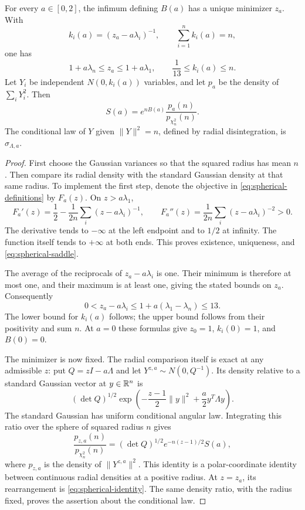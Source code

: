 \begin{lemma}
\label{lem:spherical-identity}
For every $a\in[0,2]$, the infimum defining $B(a)$ has a unique minimizer
$z_a$.  With
\begin{equation}
\label{eq:spherical-saddle}
 k_i(a)=(z_a-a\lambda_i)^{-1},
 \qquad
 \sum_{i=1}^n k_i(a)=n,
\end{equation}
one has
\[
 1+a\lambda_n\le z_a\le1+a\lambda_1,
 \qquad
 \frac1{13}\le k_i(a)\le n.
\]
Let $Y_i$ be independent $N(0,k_i(a))$ variables, and let $p_a$ be the
density of $\sum_iY_i^2$.  Then
\begin{equation}
\label{eq:spherical-identity}
 S(a)=e^{nB(a)}
       \frac{p_a(n)}{p_{\chi_n^2}(n)}.
\end{equation}
The conditional law of $Y$ given $\|Y\|^2=n$, defined by radial
disintegration, is $\sigma_{\Lambda,a}$.
\end{lemma}

\begin{proof}
First choose the Gaussian variances so that the squared radius has
mean $n$. Then compare its radial density with the standard Gaussian
density at that same radius. To implement the first step, denote the
objective in \eqref{eq:spherical-definitions} by $F_a(z)$. On
$z>a\lambda_1$,
\[
 F_a'(z)=\frac12-\frac1{2n}\sum_i(z-a\lambda_i)^{-1},
 \qquad
 F_a''(z)=\frac1{2n}\sum_i(z-a\lambda_i)^{-2}>0.
\]
The derivative tends to $-\infty$ at the left endpoint and to $1/2$
at infinity.  The function itself tends to $+\infty$ at both ends.
This proves existence, uniqueness, and \eqref{eq:spherical-saddle}.

The average of the reciprocals of $z_a-a\lambda_i$ is one.  Their
minimum is therefore at most one, and their maximum is at least one,
giving the stated bounds on $z_a$.  Consequently
\[
 0<z_a-a\lambda_i
 \le1+a(\lambda_1-\lambda_n)\le13.
\]
The lower bound for $k_i(a)$ follows; the upper bound follows from
their positivity and sum $n$.  At $a=0$ these formulas give
$z_0=1$, $k_i(0)=1$, and $B(0)=0$.

The minimizer is now fixed. The radial comparison itself is exact
at any admissible $z$: put $Q=zI-a\Lambda$ and let
$Y^{z,a}\sim N(0,Q^{-1})$.  Its density relative to a standard
Gaussian vector at $y\in\mathbb R^n$ is
\[
 (\det Q)^{1/2}
 \exp\left(-\frac{z-1}{2}\|y\|^2+\frac a2y^T\Lambda y\right).
\]
The standard Gaussian has uniform conditional angular law.  Integrating
this ratio over the sphere of squared radius $n$ gives
\begin{equation}
\label{eq:spherical-radial-ratio}
 \frac{p_{z,a}(n)}{p_{\chi_n^2}(n)}
 =(\det Q)^{1/2}e^{-n(z-1)/2}S(a),
\end{equation}
where $p_{z,a}$ is the density of $\|Y^{z,a}\|^2$.
This identity is a polar-coordinate identity between continuous radial
densities at a positive radius.  At $z=z_a$, its rearrangement is
\eqref{eq:spherical-identity}.  The same density ratio, with the radius
fixed, proves the assertion about the conditional law.
\end{proof}


